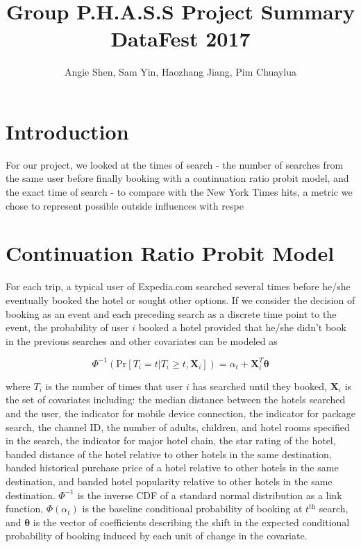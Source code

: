 \documentclass[a4paper]{article}
\title{Group P.H.A.S.S Project Summary \\ DataFest 2017}
\author{Angie Shen, Sam Yin, Haozhang Jiang, Pim Chuaylua}
\begin{document}
\maketitle

\section{Introduction}
For our project, we looked at the times of search - the number of searches from the same user before finally booking with a continuation ratio probit model, and the exact time of search - to compare with the New York Times hits, a metric we chose to represent possible outside influences with respe

\section{Continuation Ratio Probit Model}

For each trip, a typical user of Expedia.com searched several times before he/she eventually booked the hotel or sought other options. If we consider the decision of booking as an event and each preceding search as a discrete time point to the event, the probability of user $i$ booked a hotel provided that he/she didn't book in the previous searches and other covariates can be modeled as 

$$\Phi^{-1}(\mbox{Pr}[T_i = t|T_i \geq t, \mathbf{X}_i]) = \alpha_t + \mathbf{X}_{i}^T\bm{\theta}$$

where $T_i$ is the number of times that user $i$ has searched until they booked, $\mathbf{X}_i$ is the set of covariates including: the median distance between the hotels searched and the user, the indicator for mobile device connection, the indicator for package search, the channel ID, the number of adults, children, and hotel rooms specified in the search, the indicator for major hotel chain, the star rating of the hotel, banded distance of the hotel relative to other hotels in the same destination, banded historical purchase price of a hotel relative to other hotels in the same destination, and banded hotel popularity relative to other hotels in the same destination. $\Phi^{-1}$ is the inverse CDF of a standard normal distribution as a link function, $\Phi(\alpha_t)$ is the baseline conditional probability of booking at $t^{\text{th}}$ search, and $\bm{\theta}$ is the vector of coefficients describing the shift in the expected conditional probability of booking induced by each unit of change in the covariate.
\end{document}
